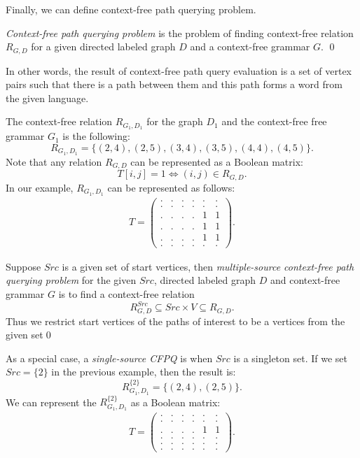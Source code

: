 Finally, we can define context-free path querying problem.
\begin{definition}
    \emph{Context-free path querying problem} is the problem of finding context-free relation $R_{G, D}$ for a given directed labeled graph $D$ and a context-free grammar $G$. \qed
\end{definition}

In other words, the result of context-free path query evaluation is a set of vertex pairs such that there is a path between them and this path forms a word from the given language.

The context-free relation $R_{G_1,D_1}$ for the graph $D_1$ and the context-free free grammar $G_1$ is the following:
$$R_{G_1, D_1} = \{(2, 4), (2, 5), (3, 4), (3, 5), (4, 4), (4, 5)\}.$$
Note that any relation $R_{G, D}$ can be represented as a Boolean matrix: $$T[i,j] = 1 \iff (i,j) \in R_{G, D}.$$
In our example, $R_{G_1, D_1}$ can be represented as follows:
{
    \renewcommand{\arraystretch}{0.7}
    \setlength\arraycolsep{2pt}
\begin{align*}
T =
\begin{pmatrix}
    . & . & . & . & . & . \\
    . & . & . & . & . & . \\
    . & . & . & . & 1 & 1 \\
    . & . & . & . & 1 & 1 \\
    . & . & . & . & 1 & 1 \\
    . & . & . & . & . & .
\end{pmatrix}.
\end{align*}
}

\begin{definition}
    Suppose $Src$ is a given set of start vertices, then \textit{multiple-source context-free path querying problem} for the given $Src$, directed labeled graph $D$ and context-free grammar $G$ is to find a context-free relation
    $$R_{G, D}^{Src} \subseteq Src\times V \subseteq R_{G,D}.$$
    Thus we restrict start vertices of the paths of interest to be a vertices from the given set\qed
\end{definition}

As a special case, a \emph{single-source CFPQ} is when $Src$ is a singleton set.
If we set $Src=\{2\}$ in the previous example, then the result is: $$R_{G_1, D_1}^{\{2\}} = \{(2, 4), (2, 5)\}.$$
We can represent the $R_{G_1, D_1}^{\{2\}}$ as a Boolean matrix:
{
    \renewcommand{\arraystretch}{0.7}
    \setlength\arraycolsep{2pt}
\begin{align*}
T =
\begin{pmatrix}
    . & . & . & . & . & . \\
    . & . & . & . & . & . \\
    . & . & . & . & 1 & 1 \\
    . & . & . & . & . & . \\
    . & . & . & . & . & . \\
    . & . & . & . & . & .
\end{pmatrix}.
\end{align*}
}

